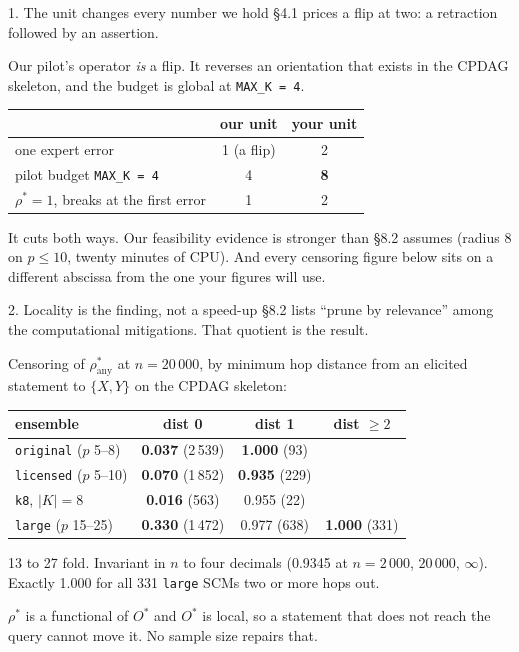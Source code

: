 \documentclass[10pt,aspectratio=169]{beamer}
\newcommand{\ok}[1]{\textcolor{good}{#1}}
\newcommand{\no}[1]{\textcolor{bad}{#1}}
\begin{document}
\begin{frame}{1. The unit changes every number we hold}
\S4.1 prices a flip at two: a retraction followed by an assertion.

\medskip
Our pilot's operator \emph{is} a flip. It reverses an orientation that exists in the CPDAG skeleton,
and the budget is global at \texttt{MAX\_K = 4}.

\begin{center}
\begin{tabular}{lcc}
\toprule
 & our unit & your unit \\
\midrule
one expert error & 1 (a flip) & 2 \\
pilot budget \texttt{MAX\_K = 4} & 4 & \textbf{8} \\
$\rho^\ast = 1$, breaks at the first error & 1 & 2 \\
\bottomrule
\end{tabular}
\end{center}

\medskip
It cuts both ways. Our feasibility evidence is \ok{stronger} than \S8.2 assumes (radius 8 on
$p \le 10$, twenty minutes of CPU). And every censoring figure below sits on a \no{different
abscissa} from the one your figures will use.
\end{frame}

\begin{frame}[shrink=12]{2. Locality is the finding, not a speed-up}
\S8.2 lists ``prune by relevance'' among the computational mitigations. That quotient is the result.

\smallskip
Censoring of $\rho^\ast_{\text{any}}$ at $n = 20\,000$, by minimum hop distance from an elicited
statement to $\{X, Y\}$ on the CPDAG skeleton:

\begin{center}
\begin{tabular}{lccc}
\toprule
ensemble & dist 0 & dist 1 & dist $\ge 2$ \\
\midrule
\texttt{original} ($p$ 5--8)   & \textbf{0.037} \tiny(2\,539) & \textbf{1.000} \tiny(93)  & \\
\texttt{licensed} ($p$ 5--10)  & \textbf{0.070} \tiny(1\,852) & \textbf{0.935} \tiny(229) & \\
\texttt{k8}, $|K| = 8$         & \textbf{0.016} \tiny(563)    & 0.955 \tiny(22)           & \\
\texttt{large} ($p$ 15--25)    & \textbf{0.330} \tiny(1\,472) & 0.977 \tiny(638)          & \textbf{1.000} \tiny(331) \\
\bottomrule
\end{tabular}
\end{center}

\medskip
\ok{13 to 27 fold.} Invariant in $n$ to four decimals (0.9345 at $n = 2\,000$, $20\,000$, $\infty$).
Exactly 1.000 for all 331 \texttt{large} SCMs two or more hops out.

\medskip
$\rho^\ast$ is a functional of $O^\ast$ and $O^\ast$ is local, so a statement that does not reach the
query cannot move it. No sample size repairs that.
\end{frame}
\end{document}
